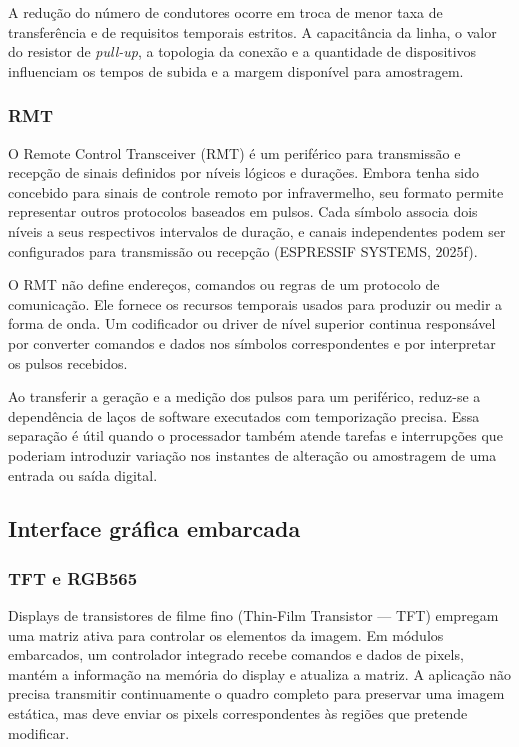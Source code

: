\documentclass{article}
\begin{document}
A redu\c{c}\~ao do n\'umero de condutores ocorre em troca de menor taxa de transfer\^encia e de requisitos temporais estritos. A capacit\^ancia da linha, o valor do resistor de \emph{pull-up}, a topologia da conex\~ao e a quantidade de dispositivos influenciam os tempos de subida e a margem dispon\'ivel para amostragem.


\subsubsection{RMT}


O Remote Control Transceiver (RMT) \'e um perif\'erico para transmiss\~ao e recep\c{c}\~ao de sinais definidos por n\'iveis l\'ogicos e dura\c{c}\~oes. Embora tenha sido concebido para sinais de controle remoto por infravermelho, seu formato permite representar outros protocolos baseados em pulsos. Cada s\'imbolo associa dois n\'iveis a seus respectivos intervalos de dura\c{c}\~ao, e canais independentes podem ser configurados para transmiss\~ao ou recep\c{c}\~ao (ESPRESSIF SYSTEMS, 2025f).


O RMT n\~ao define endere\c{c}os, comandos ou regras de um protocolo de comunica\c{c}\~ao. Ele fornece os recursos temporais usados para produzir ou medir a forma de onda. Um codificador ou driver de n\'ivel superior continua respons\'avel por converter comandos e dados nos s\'imbolos correspondentes e por interpretar os pulsos recebidos.


Ao transferir a gera\c{c}\~ao e a medi\c{c}\~ao dos pulsos para um perif\'erico, reduz-se a depend\^encia de la\c{c}os de software executados com temporiza\c{c}\~ao precisa. Essa separa\c{c}\~ao \'e \'util quando o processador tamb\'em atende tarefas e interrup\c{c}\~oes que poderiam introduzir varia\c{c}\~ao nos instantes de altera\c{c}\~ao ou amostragem de uma entrada ou sa\'ida digital.


\subsection{Interface gr\'afica embarcada}


\subsubsection{TFT e RGB565}


Displays de transistores de filme fino (Thin-Film Transistor --- TFT) empregam uma matriz ativa para controlar os elementos da imagem. Em m\'odulos embarcados, um controlador integrado recebe comandos e dados de pixels, mant\'em a informa\c{c}\~ao na mem\'oria do display e atualiza a matriz. A aplica\c{c}\~ao n\~ao precisa transmitir continuamente o quadro completo para preservar uma imagem est\'atica, mas deve enviar os pixels correspondentes \`as regi\~oes que pretende modificar.
\end{document}
